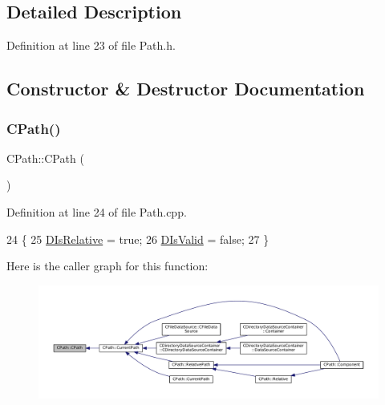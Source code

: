 \subsection{Detailed Description}


Definition at line 23 of file Path.\+h.



\subsection{Constructor \& Destructor Documentation}
\hypertarget{classCPath_a26b6e34c8019d440136848f809c13897}{}\label{classCPath_a26b6e34c8019d440136848f809c13897} 
\subsubsection{\texorpdfstring{C\+Path()}{CPath()}\hspace{0.1cm}{\footnotesize\ttfamily [1/3]}}
{\footnotesize\ttfamily C\+Path\+::\+C\+Path (\begin{DoxyParamCaption}{ }\end{DoxyParamCaption})}



Definition at line 24 of file Path.\+cpp.


\begin{DoxyCode}
24             \{
25     \hyperlink{classCPath_af705ff149bb2281c67afb84fff550eb9}{DIsRelative} = \textcolor{keyword}{true};
26     \hyperlink{classCPath_a992aca27a1cba1c3bae3d04438821192}{DIsValid} = \textcolor{keyword}{false};
27 \}
\end{DoxyCode}
Here is the caller graph for this function\+:\nopagebreak
\begin{figure}[H]
\begin{center}
\leavevmode
\includegraphics[width=350pt]{classCPath_a26b6e34c8019d440136848f809c13897_icgraph}
\end{center}
\end{figure}
\hypertarget{classCPath_a728b9e9aea13c9dc51b9bb1f6dbc76fd}{}\label{classCPath_a728b9e9aea13c9dc51b9bb1f6dbc76fd} 
